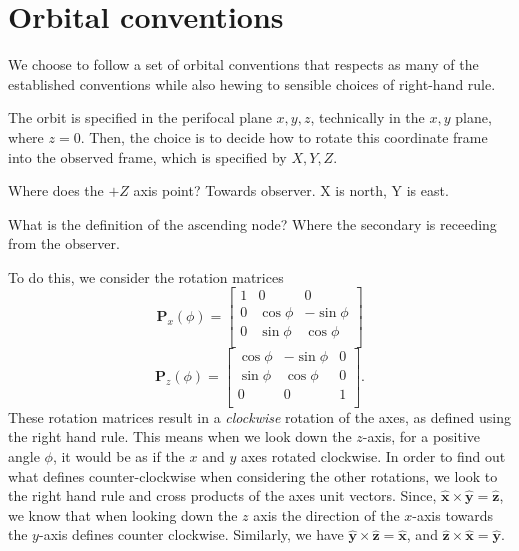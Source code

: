 \documentclass[modern]{aastex62}
\begin{document}
\section{Orbital conventions}
We choose to follow a set of orbital conventions that respects as many of the established conventions while also hewing to sensible choices of right-hand rule.

The orbit is specified in the perifocal plane $x,y,z$, technically in the $x,y$ plane, where $z=0$. Then, the choice is to decide how to rotate this coordinate frame into the observed frame, which is specified by $X,Y,Z$.

Where does the $+Z$ axis point? Towards observer. X is north, Y is east.

What is the definition of the ascending node? Where the secondary is receeding from the observer.

To do this, we consider the rotation matrices
\begin{equation}
  \boldsymbol{P}_x(\phi) = \left [
  \begin{array}{ccc}
    1 & 0 & 0 \\
    0 & \cos \phi & - \sin \phi \\
    0 & \sin \phi & \cos \phi \\
    \end{array}\right]
\end{equation}
\begin{equation}
  \boldsymbol{P}_z (\phi) = \left [
  \begin{array}{ccc}
    \cos \phi & - \sin \phi & 0\\
    \sin \phi & \cos \phi & 0 \\
    0 & 0 & 1 \\
    \end{array}\right].
\end{equation}
These rotation matrices result in a \emph{clockwise} rotation of the axes, as defined using the right hand rule. This means when we look down the $z$-axis, for a positive angle $\phi$, it would be as if the $x$ and $y$ axes rotated clockwise.
In order to find out what defines counter-clockwise when considering the other rotations, we look to the right hand rule and cross products of the axes unit vectors. Since, $\hat{\bm x} \times \hat{\bm y} = \hat{\bm z}$, we know that when looking down the $z$ axis the direction of the $x$-axis towards the $y$-axis defines counter clockwise.
Similarly, we have $\hat{{\bm y}} \times \hat{{\bm z}} = \hat{{\bm x}}$, and $\hat{{\bm z}} \times \hat{{\bm x}} = \hat{{\bm y}}$.
\end{document}
